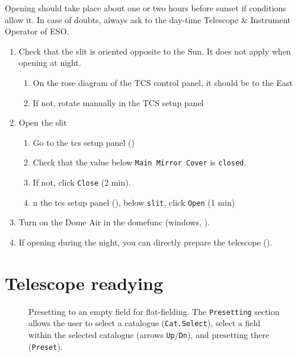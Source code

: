 \documentclass[11pt,fleqn,a4paper]{book}
\begin{document}
Opening should take place about one or two hours before sunset if conditions allow it. In case of doubts, always ask to the day-time Telescope \& Instrument Operator of ESO.

\label{proc:open}
\begin{enumerate}
\item Check that the \gls{slit} is oriented opposite to the Sun. It does not apply when opening at night.
        \begin{enumerate}
            \item On the \gls{rose diagram} of the \gls{TCS control panel}, it should be to the East
            \item If not, rotate manually in the \gls{TCS setup panel}
        \end{enumerate}
\item Open the \gls{slit}\label{list:slitopen}
         \begin{enumerate}
           \item Go to the \gls{tcs} setup panel ()
           \item Check that the value below \texttt{Main Mirror Cover} is \texttt{closed}.
           \item If not, click \texttt{Close} (2 min).
           \item n the \gls{tcs} setup panel (), below \texttt{slit}, click \texttt{Open} (1 min)
         \end{enumerate} 
\item Turn on the Dome Air in the \gls{domefunc} (\gls{windows}, ).
\item If opening during the night, you can directly prepare the telescope ().
\end{enumerate}

\section{Telescope readying}

\begin{figure*}
\centering
{}%
\hspace{0.1\linewidth}%
%
\caption[Presetting to an empty field for flat-fielding]{Presetting to an empty field for flat-fielding.  The \texttt{Presetting} section allows the user to select a catalogue (\texttt{Cat.Select}), select a field within the selected catalogue (arrows \texttt{Up}/\texttt{Dn}), and presetting there (\texttt{Preset}).}
\label{fig:emptyfield}
\end{figure*}
\end{document}
